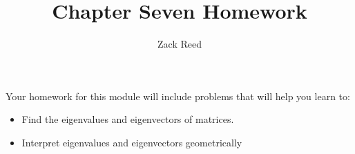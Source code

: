\documentclass{ximera}
\author{Zack Reed}
\title{Chapter Seven Homework}
\begin{document}
 
\begin{abstract}
\end{abstract}
 
\maketitle
 
Your homework for this module will include problems that will help you learn to:
 
\begin{itemize}
\item Find the eigenvalues and eigenvectors of matrices.
\item Interpret eigenvalues and eigenvectors geometrically
\end{itemize}
 
 
\end{document}
